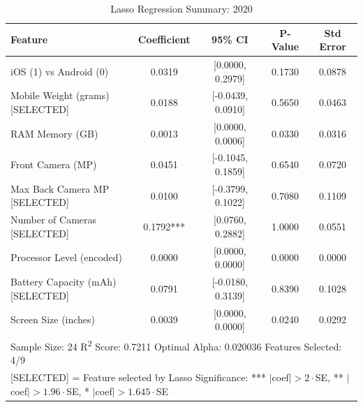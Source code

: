 \documentclass[12pt]{article}
\begin{document}
\begin{table}[ht]
\centering
\caption{Lasso Regression Summary: 2020}
\begin{tabular}{lcccc}
\toprule
Feature & Coefficient & 95\% CI & P-Value & Std Error \\
\midrule
iOS (1) vs Android (0) & 0.0319 & {[0.0000, 0.2979]} & 0.1730 & 0.0878 \\
Mobile Weight (grams) [SELECTED] & 0.0188 & {[-0.0439, 0.0910]} & 0.5650 & 0.0463 \\
RAM Memory (GB) & 0.0013 & {[0.0000, 0.0006]} & 0.0330 & 0.0316 \\
Front Camera (MP) & 0.0451 & {[-0.1045, 0.1859]} & 0.6540 & 0.0720 \\
Max Back Camera MP [SELECTED] & 0.0100 & {[-0.3799, 0.1022]} & 0.7080 & 0.1109 \\
Number of Cameras [SELECTED] & 0.1792*** & {[0.0760, 0.2882]} & 1.0000 & 0.0551 \\
Processor Level (encoded) & 0.0000 & {[0.0000, 0.0000]} & 0.0000 & 0.0000 \\
Battery Capacity (mAh) [SELECTED] & 0.0791 & {[-0.0180, 0.3139]} & 0.8390 & 0.1028 \\
Screen Size (inches) & 0.0039 & {[0.0000, 0.0000]} & 0.0240 & 0.0292 \\
\midrule
\multicolumn{5}{l}{\footnotesize Sample Size: 24 \quad R\textsuperscript{2} Score: 0.7211 \quad Optimal Alpha: 0.020036 \quad Features Selected: 4/9} \\
\multicolumn{5}{l}{\footnotesize [SELECTED] = Feature selected by Lasso \quad Significance: *** $|$coef$|>2\cdot$SE, ** $|$coef$|>1.96\cdot$SE, * $|$coef$|>1.645\cdot$SE} \\
\bottomrule
\end{tabular}
\end{table}
\end{document}
